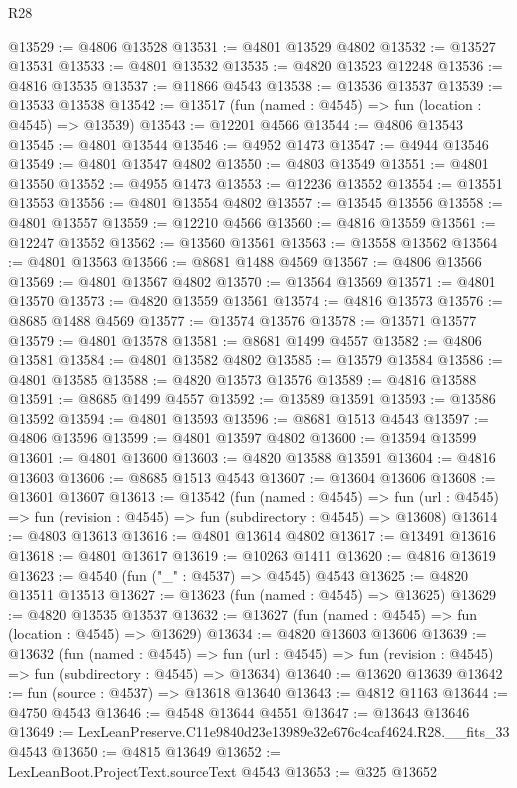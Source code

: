 \begin{lexlean}{R28}
\begin{coremodule}
@13529 := @4806 @13528
@13531 := @4801 @13529 @4802
@13532 := @13527 @13531
@13533 := @4801 @13532
@13535 := @4820 @13523 @12248
@13536 := @4816 @13535
@13537 := @11866 @4543
@13538 := @13536 @13537
@13539 := @13533 @13538
@13542 := @13517 (fun (named : @4545) => fun (location : @4545) => @13539)
@13543 := @12201 @4566
@13544 := @4806 @13543
@13545 := @4801 @13544
@13546 := @4952 @1473
@13547 := @4944 @13546
@13549 := @4801 @13547 @4802
@13550 := @4803 @13549
@13551 := @4801 @13550
@13552 := @4955 @1473
@13553 := @12236 @13552
@13554 := @13551 @13553
@13556 := @4801 @13554 @4802
@13557 := @13545 @13556
@13558 := @4801 @13557
@13559 := @12210 @4566
@13560 := @4816 @13559
@13561 := @12247 @13552
@13562 := @13560 @13561
@13563 := @13558 @13562
@13564 := @4801 @13563
@13566 := @8681 @1488 @4569
@13567 := @4806 @13566
@13569 := @4801 @13567 @4802
@13570 := @13564 @13569
@13571 := @4801 @13570
@13573 := @4820 @13559 @13561
@13574 := @4816 @13573
@13576 := @8685 @1488 @4569
@13577 := @13574 @13576
@13578 := @13571 @13577
@13579 := @4801 @13578
@13581 := @8681 @1499 @4557
@13582 := @4806 @13581
@13584 := @4801 @13582 @4802
@13585 := @13579 @13584
@13586 := @4801 @13585
@13588 := @4820 @13573 @13576
@13589 := @4816 @13588
@13591 := @8685 @1499 @4557
@13592 := @13589 @13591
@13593 := @13586 @13592
@13594 := @4801 @13593
@13596 := @8681 @1513 @4543
@13597 := @4806 @13596
@13599 := @4801 @13597 @4802
@13600 := @13594 @13599
@13601 := @4801 @13600
@13603 := @4820 @13588 @13591
@13604 := @4816 @13603
@13606 := @8685 @1513 @4543
@13607 := @13604 @13606
@13608 := @13601 @13607
@13613 := @13542
    (fun (named : @4545) =>
    fun (url : @4545) => fun (revision : @4545) => fun (subdirectory : @4545) => @13608)
@13614 := @4803 @13613
@13616 := @4801 @13614 @4802
@13617 := @13491 @13616
@13618 := @4801 @13617
@13619 := @10263 @1411
@13620 := @4816 @13619
@13623 := @4540 (fun ("_" : @4537) => @4545) @4543
@13625 := @4820 @13511 @13513
@13627 := @13623 (fun (named : @4545) => @13625)
@13629 := @4820 @13535 @13537
@13632 := @13627 (fun (named : @4545) => fun (location : @4545) => @13629)
@13634 := @4820 @13603 @13606
@13639 := @13632
    (fun (named : @4545) =>
    fun (url : @4545) => fun (revision : @4545) => fun (subdirectory : @4545) => @13634)
@13640 := @13620 @13639
@13642 := fun (source : @4537) => @13618 @13640
@13643 := @4812 @1163
@13644 := @4750 @4543
@13646 := @4548 @13644 @4551
@13647 := @13643 @13646
@13649 := LexLeanPreserve.C11e9840d23e13989e32e676c4caf4624.R28.__fits_33 @4543
@13650 := @4815 @13649
@13652 := LexLeanBoot.ProjectText.sourceText @4543
@13653 := @325 @13652

\end{coremodule}
\end{lexlean}
